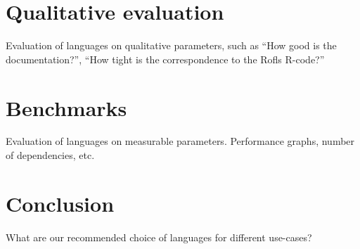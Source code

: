 
\chapter{Qualitative evaluation}
Evaluation of languages on qualitative parameters, such as ``How good
is the documentation?'', ``How tight is the correspondence to the
Rofls R-code?''

\chapter{Benchmarks}
Evaluation of languages on measurable parameters. Performance graphs,
number of dependencies, etc.

\chapter{Conclusion}
What are our recommended choice of languages for different use-cases?

